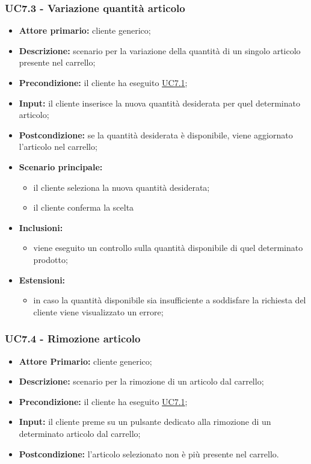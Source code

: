 \subsubsection{UC7.3 - Variazione quantità articolo}
\label{UC7.3}
\begin{itemize}
    \item \textbf{Attore primario:} cliente generico;
    \item \textbf{Descrizione:} scenario per la variazione della quantità di un singolo articolo presente nel carrello;
    \item \textbf{Precondizione:} il cliente ha eseguito \hyperref[UC7.1]{UC7.1};
    \item \textbf{Input:} il cliente inserisce la nuova quantità desiderata per quel determinato articolo;
    \item \textbf{Postcondizione:} se la quantità desiderata è disponibile, viene aggiornato l'articolo nel carrello;
    \item \textbf{Scenario principale:}
    \begin{itemize}
        \item il cliente seleziona la nuova quantità desiderata;
        \item il cliente conferma la scelta
    \end{itemize}
    \item \textbf{Inclusioni:}
    \begin{itemize}
        \item viene eseguito un controllo sulla quantità disponibile di quel determinato prodotto;
    \end{itemize}
    \item \textbf{Estensioni:}
    \begin{itemize}
        \item in caso la quantità disponibile sia insufficiente a soddisfare la richiesta del cliente viene visualizzato un errore;
    \end{itemize}
\end{itemize}

\subsubsection{UC7.4 - Rimozione articolo}
\label{UC7.4}
\begin{itemize}
    \item \textbf{Attore Primario:} cliente generico;
    \item \textbf{Descrizione:} scenario per la rimozione di un articolo dal carrello;
    \item \textbf{Precondizione:} il cliente ha eseguito \hyperref[UC7.1]{UC7.1};
    \item \textbf{Input:} il cliente preme su un pulsante dedicato alla rimozione di un determinato articolo dal carrello;
    \item \textbf{Postcondizione:} l'articolo selezionato non è più presente nel carrello.
\end{itemize}

